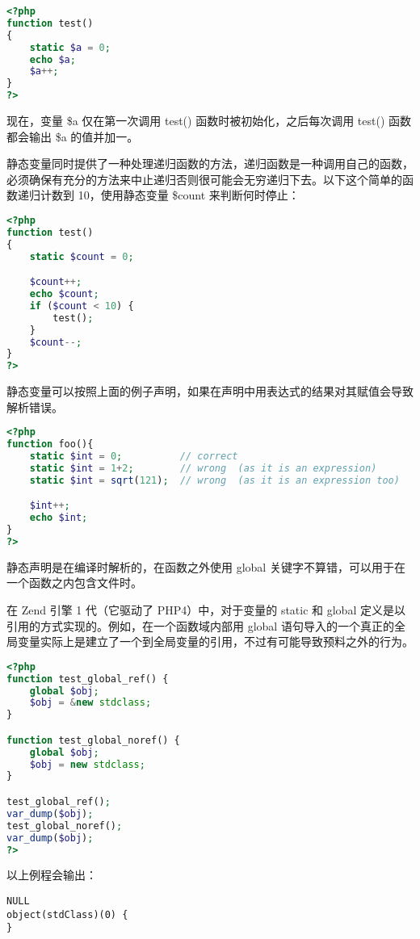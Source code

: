 \begin{lstlisting}[language=PHP]
<?php
function test()
{
    static $a = 0;
    echo $a;
    $a++;
}
?>
\end{lstlisting}

现在，变量 \$a 仅在第一次调用 test() 函数时被初始化，之后每次调用 test() 函数都会输出 \$a 的值并加一。

静态变量同时提供了一种处理递归函数的方法，递归函数是一种调用自己的函数，必须确保有充分的方法来中止递归否则很可能会无穷递归下去。以下这个简单的函数递归计数到 10，使用静态变量 \$count 来判断何时停止：

\begin{lstlisting}[language=PHP]
<?php
function test()
{
    static $count = 0;

    $count++;
    echo $count;
    if ($count < 10) {
        test();
    }
    $count--;
}
?>
\end{lstlisting}

静态变量可以按照上面的例子声明，如果在声明中用表达式的结果对其赋值会导致解析错误。


\begin{lstlisting}[language=PHP]
<?php
function foo(){
    static $int = 0;          // correct
    static $int = 1+2;        // wrong  (as it is an expression)
    static $int = sqrt(121);  // wrong  (as it is an expression too)

    $int++;
    echo $int;
}
?>
\end{lstlisting}

静态声明是在编译时解析的，在函数之外使用 global 关键字不算错，可以用于在一个函数之内包含文件时。

在 Zend 引擎 1 代（它驱动了 PHP4）中，对于变量的 static 和 global 定义是以引用的方式实现的。例如，在一个函数域内部用 global 语句导入的一个真正的全局变量实际上是建立了一个到全局变量的引用，不过有可能导致预料之外的行为。

\begin{lstlisting}[language=PHP]
<?php
function test_global_ref() {
    global $obj;
    $obj = &new stdclass;
}

function test_global_noref() {
    global $obj;
    $obj = new stdclass;
}

test_global_ref();
var_dump($obj);
test_global_noref();
var_dump($obj);
?>
\end{lstlisting}

以上例程会输出：

\begin{verbatim}
NULL
object(stdClass)(0) {
}
\end{verbatim}

